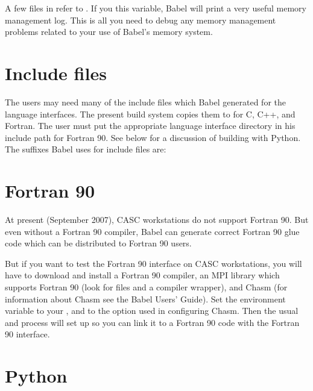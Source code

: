 A few files in  refer to
.  If you  this variable,
Babel will print a very useful memory management log.  This is all you
need to debug any memory management problems related to your use of
Babel's memory system.

\section{Include files}

The users may need many of the include files which Babel generated for the language
interfaces.  The present build system copies them to
 for C, C++, and Fortran.  The user must put the
appropriate language interface directory in his include path for
Fortran 90.  See below for a discussion of building with Python.
 The suffixes Babel uses for include files are:
\begin{list}{.}{\setlength{\itemsep}{0in}}
\item {}
\item {}
\item {}
\item {}
\end{list}

\section{Fortran 90}

At present (September 2007), CASC workstations do not support Fortran
90.  But even without a Fortran 90 compiler, Babel can generate
correct Fortran 90 glue code which can be distributed to Fortran 90
users.

But if you want to test the Fortran 90 interface on CASC workstations,
you will have to download and install a Fortran 90 compiler, an MPI
library which supports Fortran 90 (look for  files and a
 compiler wrapper), and Chasm (for information about
Chasm see the Babel Users' Guide).  Set the environment variable
 to your , and  to the 
option used in configuring Chasm.  Then the usual  and
 process will set up \hypre{} so you can link it to a
Fortran 90 code with the Fortran 90 interface.

\section{Python}

